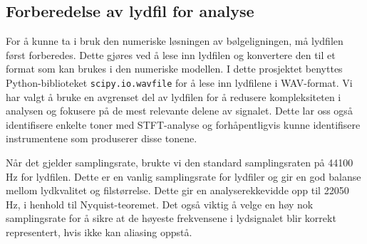 \subsection{Forberedelse av lydfil for analyse}
For å kunne ta i bruk den numeriske løsningen av bølgeligningen, må lydfilen først forberedes. Dette gjøres ved å lese inn lydfilen 
og konvertere den til et format som kan brukes i den numeriske modellen. I dette prosjektet benyttes Python-biblioteket 
\verb|scipy.io.wavfile| for å lese inn lydfilene i WAV-format. Vi har valgt å bruke en avgrenset del av lydfilen for å redusere kompleksiteten
i analysen og fokusere på de mest relevante delene av signalet. Dette lar oss også identifisere enkelte toner med STFT-analyse og forhåpentligvis kunne
identifisere instrumentene som produserer disse tonene.

Når det gjelder samplingsrate, brukte vi den standard samplingsraten på 44100 Hz for lydfilen. Dette er en vanlig samplingsrate for 
lydfiler og gir en god balanse mellom lydkvalitet og filstørrelse. Dette gir en analyserekkevidde opp til 22050 Hz, i henhold til Nyquist-teoremet.
Det også viktig å velge en høy nok samplingsrate for å sikre at de høyeste frekvensene i lydsignalet blir korrekt representert, hvis ikke kan aliasing oppstå.
